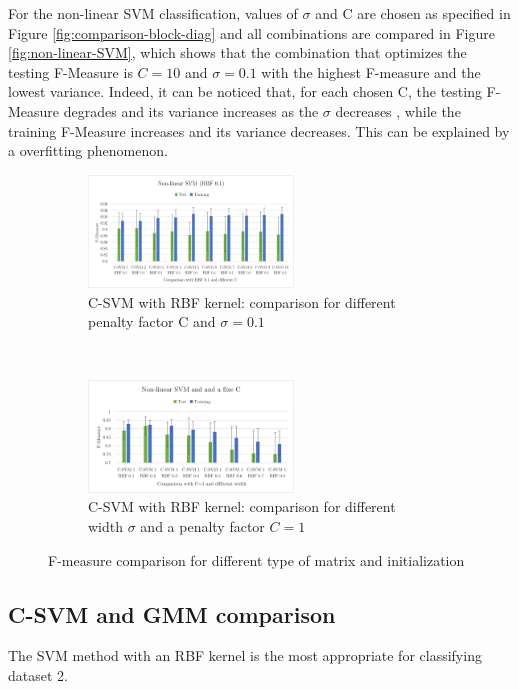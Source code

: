 \documentclass[a4paper,10pt]{article}
\begin{document}
 For the non-linear SVM classification, values of $\sigma$ and C are chosen as specified in Figure \ref{fig:comparison-block-diag} and all combinations are compared in Figure \ref{fig:non-linear-SVM}, which shows that the combination that optimizes the testing F-Measure is $ C = 10 $ and $ \sigma = 0.1$ with the highest F-measure and the lowest variance. Indeed, it can be noticed that, for each chosen C, the testing F-Measure degrades and its variance increases as the $\sigma$ decreases , while the training F-Measure increases and its variance decreases. This can be explained by a overfitting phenomenon. 


 \begin{figure}[H]
\centering
    \begin{subfigure}[t]{0.3\textwidth}
      \centering
      \includegraphics[height=3cm]{pictures/non-linear-SVM_fixeRBF}
      \caption{C-SVM with RBF kernel: comparison for different penalty factor C  and $\sigma = 0.1$}
      \label{fig:non-linear-SVM_fixeRBF}
     \end{subfigure}
      ~
    \begin{subfigure}[t]{0.3\textwidth}
      \centering
      \includegraphics[height=3cm]{pictures/non-linear-SVM_fixeC}
      \caption{C-SVM with RBF kernel: comparison for different width $\sigma$ and a penalty factor $C = 1$}
      \label{fig:non-linear-SVM_fixeC}
     \end{subfigure}
     \caption{F-measure comparison for different type of matrix and initialization}
\end{figure}

\subsection{C-SVM and GMM comparison}

The SVM method with an RBF kernel is the most appropriate for classifying dataset 2.\\
\end{document}
